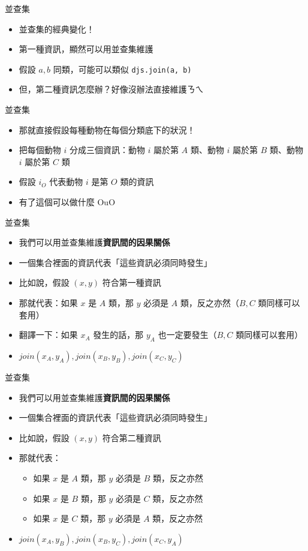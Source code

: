 \documentclass[standalone]{beamer}
\begin{document}
\begin{frame}{並查集}
  \begin{itemize}
    \item 並查集的經典變化！
    \item 第一種資訊，顯然可以用並查集維護
    \item 假設 $a, b$ 同類，可能可以類似 \texttt{djs.join(a, b)}
    \item 但，第二種資訊怎麼辦？好像沒辦法直接維護ㄋㄟ
  \end{itemize}
\end{frame}

\begin{frame}{並查集}
  \begin{itemize}
    \item 那就直接假設每種動物在每個分類底下的狀況！
    \item 把每個動物 $i$ 分成三個資訊：動物 $i$ 屬於第 $A$ 類、動物 $i$ 屬於第 $B$ 類、動物 $i$ 屬於第 $C$ 類
    \item 假設 $i_O$ 代表動物 $i$ 是第 $O$ 類的資訊
    \item 有了這個可以做什麼 OuO
  \end{itemize}
\end{frame}

\begin{frame}{並查集}
  \begin{itemize}
    \item 我們可以用並查集維護\textbf{資訊間的因果關係}
    \item 一個集合裡面的資訊代表「這些資訊必須同時發生」
    \item 比如說，假設 $(x, y)$ 符合第一種資訊
    \item 那就代表：如果 $x$ 是 $A$ 類，那 $y$ 必須是 $A$ 類，反之亦然（$B, C$ 類同樣可以套用）
    \item 翻譯一下：如果 $x_A$ 發生的話，那 $y_A$ 也一定要發生（$B, C$ 類同樣可以套用）
    \item $join(x_A, y_A), join(x_B, y_B), join(x_C, y_C)$
  \end{itemize}
\end{frame}

\begin{frame}{並查集}
  \begin{itemize}
    \item 我們可以用並查集維護\textbf{資訊間的因果關係}
    \item 一個集合裡面的資訊代表「這些資訊必須同時發生」
    \item 比如說，假設 $(x, y)$ 符合第二種資訊
    \item 那就代表：
    \begin{itemize}
      \item 如果 $x$ 是 $A$ 類，那 $y$ 必須是 $B$ 類，反之亦然
      \item 如果 $x$ 是 $B$ 類，那 $y$ 必須是 $C$ 類，反之亦然
      \item 如果 $x$ 是 $C$ 類，那 $y$ 必須是 $A$ 類，反之亦然
    \end{itemize}
    \item $join(x_A, y_B), join(x_B, y_C), join(x_C, y_A)$
  \end{itemize}
\end{frame}
\end{document}

